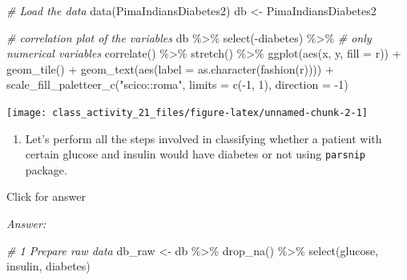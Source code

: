 \documentclass[
]{book}
\newenvironment{Shaded}{\begin{snugshade}}{\end{snugshade}}
\newcommand{\AttributeTok}[1]{\textcolor[rgb]{0.77,0.63,0.00}{#1}}
\newcommand{\CommentTok}[1]{\textcolor[rgb]{0.56,0.35,0.01}{\textit{#1}}}
\newcommand{\DecValTok}[1]{\textcolor[rgb]{0.00,0.00,0.81}{#1}}
\newcommand{\FunctionTok}[1]{\textcolor[rgb]{0.00,0.00,0.00}{#1}}
\newcommand{\NormalTok}[1]{#1}
\newcommand{\OtherTok}[1]{\textcolor[rgb]{0.56,0.35,0.01}{#1}}
\newcommand{\SpecialCharTok}[1]{\textcolor[rgb]{0.00,0.00,0.00}{#1}}
\newcommand{\StringTok}[1]{\textcolor[rgb]{0.31,0.60,0.02}{#1}}
\providecommand{\tightlist}{%
  \setlength{\itemsep}{0pt}\setlength{\parskip}{0pt}}
\begin{document}
\begin{Shaded}
\begin{Highlighting}[]
\CommentTok{\# Load the data}
\FunctionTok{data}\NormalTok{(PimaIndiansDiabetes2)}
\NormalTok{db }\OtherTok{\textless{}{-}}\NormalTok{ PimaIndiansDiabetes2}

\CommentTok{\# correlation plot of the variables}
\NormalTok{db }\SpecialCharTok{\%\textgreater{}\%}
  \FunctionTok{select}\NormalTok{(}\SpecialCharTok{{-}}\NormalTok{diabetes) }\SpecialCharTok{\%\textgreater{}\%}  \CommentTok{\# only numerical variables}
  \FunctionTok{correlate}\NormalTok{() }\SpecialCharTok{\%\textgreater{}\%}
  \FunctionTok{stretch}\NormalTok{() }\SpecialCharTok{\%\textgreater{}\%}
  \FunctionTok{ggplot}\NormalTok{(}\FunctionTok{aes}\NormalTok{(x, y, }\AttributeTok{fill =}\NormalTok{ r)) }\SpecialCharTok{+}
  \FunctionTok{geom\_tile}\NormalTok{() }\SpecialCharTok{+}
  \FunctionTok{geom\_text}\NormalTok{(}\FunctionTok{aes}\NormalTok{(}\AttributeTok{label =} \FunctionTok{as.character}\NormalTok{(}\FunctionTok{fashion}\NormalTok{(r)))) }\SpecialCharTok{+}
  \FunctionTok{scale\_fill\_paletteer\_c}\NormalTok{(}\StringTok{"scico::roma"}\NormalTok{, }\AttributeTok{limits =} \FunctionTok{c}\NormalTok{(}\SpecialCharTok{{-}}\DecValTok{1}\NormalTok{, }\DecValTok{1}\NormalTok{), }\AttributeTok{direction =} \SpecialCharTok{{-}}\DecValTok{1}\NormalTok{)}
\end{Highlighting}
\end{Shaded}

\texttt{[image: class\_activity\_21\_files/figure-latex/unnamed-chunk-2-1]}

\begin{enumerate}
\def\labelenumi{\alph{enumi}.}
\tightlist
\item
  Let's perform all the steps involved in classifying whether a patient with certain glucose and insulin would have diabetes or not using \texttt{parsnip} package.
\end{enumerate}

Click for answer

\emph{Answer:}

\begin{Shaded}
\begin{Highlighting}[]
\CommentTok{\# 1 Prepare raw data}
\NormalTok{db\_raw }\OtherTok{\textless{}{-}}\NormalTok{ db }\SpecialCharTok{\%\textgreater{}\%} \FunctionTok{drop\_na}\NormalTok{() }\SpecialCharTok{\%\textgreater{}\%}  \FunctionTok{select}\NormalTok{(glucose, insulin, diabetes)}
\end{Highlighting}
\end{Shaded}
\end{document}
